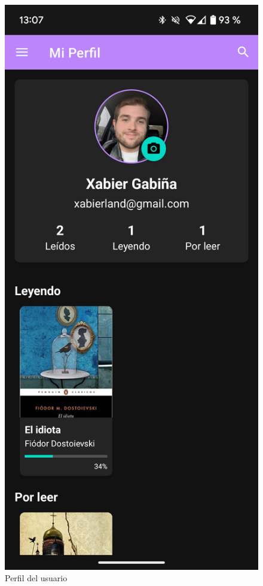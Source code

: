 \documentclass[a4paper,12pt]{report}
\begin{document}
\begin{multicols}{2}
        \begin{figure}[H]
          \centering
          \includegraphics[width=0.95\linewidth]{.img/profile.png}
          \caption{Perfil del usuario}
        \end{figure}
        

\end{multicols}
\end{document}
